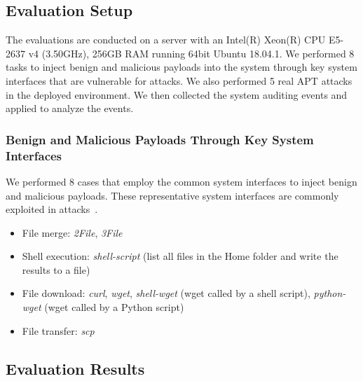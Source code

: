 \subsection{Evaluation Setup}
\label{subsec:cases}
The evaluations are conducted on a server with an Intel(R) Xeon(R) CPU E5-2637 v4 (3.50GHz), 256GB RAM running 64bit Ubuntu 18.04.1.
We performed 8 tasks to inject benign and malicious payloads into the system through key system interfaces that are vulnerable for attacks.
We also performed 5 real APT attacks in the deployed environment. 
We then collected the system auditing events and applied \tool to analyze the events.


\subsubsection{Benign and Malicious Payloads Through Key System Interfaces}
\label{subsub:benign-cases}
We performed 8 
cases that employ the common system interfaces to inject benign and malicious payloads. These representative system interfaces are commonly exploited in attacks~\cite{securitybook}.

\begin{itemize}[noitemsep, topsep=1pt, partopsep=1pt, listparindent=\parindent, leftmargin=*]
\item File merge: \emph{2File}, \emph{3File}

\item Shell execution: \emph{shell-script} (list all files in the Home folder and write the results to a file)

\item File download: \emph{curl}, \emph{wget}, \emph{shell-wget} (wget called by a shell script), \emph{python-wget} (wget called by a Python script)

\item File transfer: \emph{scp}
\end{itemize}











\subsection{Evaluation Results}
\label{subsec:eval-results}




